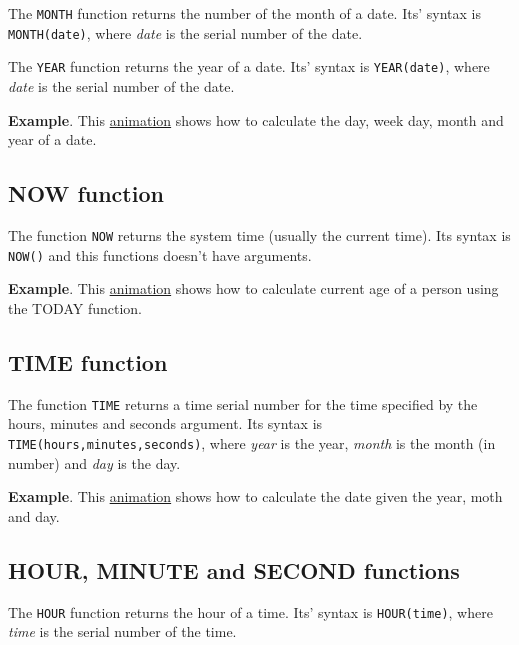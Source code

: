 The \texttt{MONTH} function returns the number of the month of a date. Its' syntax is \texttt{MONTH(date)}, where \emph{date} is the serial number of the date.

The \texttt{YEAR} function returns the year of a date. Its' syntax is \texttt{YEAR(date)}, where \emph{date} is the serial number of the date.

\textbf{Example}. This \href{http://aprendeconalf.es/office/excel/manual/img/example_function_day.gif}{animation} shows how to calculate the day, week day, month and year of a date.

\subsection{NOW function}\hypertarget{now-function}{}\label{now-function}

The function \texttt{NOW} returns the system time (usually the current time). Its syntax is \texttt{NOW()} and this functions doesn't have arguments.

\textbf{Example}. This \href{http://aprendeconalf.es/office/excel/manual/img/example_function_now.gif}{animation} shows how to calculate current age of a person using the TODAY function.

\subsection{TIME function}\hypertarget{time-function}{}\label{time-function}

The function \texttt{TIME} returns a time serial number for the time specified by the hours, minutes and seconds argument. Its syntax is \texttt{TIME(hours,minutes,seconds)}, where \emph{year} is the year, \emph{month} is the month (in number) and \emph{day} is the day.

\textbf{Example}. This \href{http://aprendeconalf.es/office/excel/manual/img/example_function_time.gif}{animation} shows how to calculate the date given the year, moth and day.

\subsection{HOUR, MINUTE and SECOND functions}\hypertarget{hour-minute-and-second-functions}{}\label{hour-minute-and-second-functions}

The \texttt{HOUR} function returns the hour of a time. Its' syntax is \texttt{HOUR(time)}, where \emph{time} is the serial number of the time.


